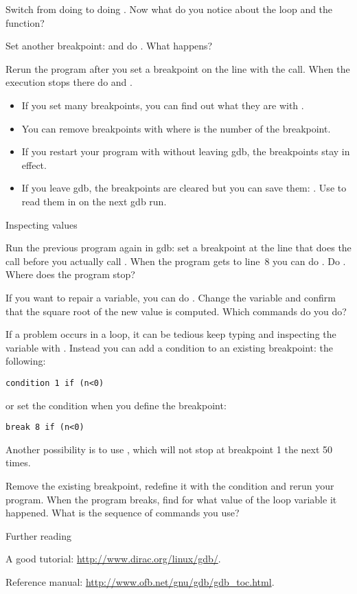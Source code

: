 Switch from doing  to doing . Now what do you notice
about the loop and the function? 

Set another breakpoint:  and do . What happens?

Rerun the program after you set a breakpoint on the line with the
 call. When the execution stops there do  and
.

\begin{itemize}
\item If you set many breakpoints, you can find out what they are with
  . 
\item You can remove breakpoints with  where  is the
  number of the breakpoint.
\item If you restart your program with  without leaving gdb,
  the breakpoints stay in effect.
\item If you leave gdb, the breakpoints are cleared but you can save
  them: . Use  to read
  them in on the next gdb run.
\end{itemize}

 {Inspecting values}

Run the previous program again in gdb: set a breakpoint at the line
that does the  call before you actually call . When the
program gets to line~8 you can do . Do . Where does
the program stop?

If you want to repair a variable, you can do . Change
the variable  and confirm that the square root of the new value
is computed. Which commands do you do?

If a problem occurs in a loop, it can be tedious keep typing 
and inspecting the variable with . Instead you can add a
condition to an existing breakpoint:
the following:
\begin{verbatim}
condition 1 if (n<0)
\end{verbatim}
or set the condition when you define the breakpoint:
\begin{verbatim}
break 8 if (n<0)
\end{verbatim}
Another possibility is to use , which will not stop at
breakpoint 1 the next 50 times.

Remove the existing breakpoint, redefine it with the condition 
and rerun your program. When the program breaks, find for what value
of the loop variable it happened. What is the sequence of commands you use?


 {Further reading}

A good tutorial: \url{http://www.dirac.org/linux/gdb/}.

Reference manual: \url{http://www.ofb.net/gnu/gdb/gdb_toc.html}.

